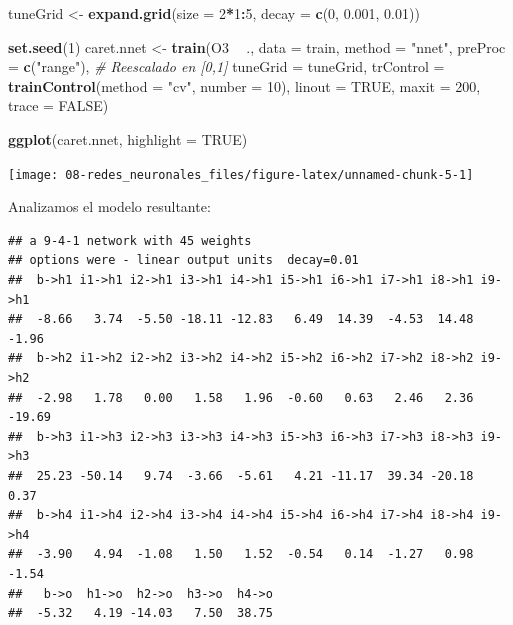 \documentclass[
  spanish,
]{book}
\newenvironment{Shaded}{\begin{snugshade}}{\end{snugshade}}
\newcommand{\CommentTok}[1]{\textcolor[rgb]{0.56,0.35,0.01}{\textit{#1}}}
\newcommand{\DataTypeTok}[1]{\textcolor[rgb]{0.13,0.29,0.53}{#1}}
\newcommand{\DecValTok}[1]{\textcolor[rgb]{0.00,0.00,0.81}{#1}}
\newcommand{\FloatTok}[1]{\textcolor[rgb]{0.00,0.00,0.81}{#1}}
\newcommand{\KeywordTok}[1]{\textcolor[rgb]{0.13,0.29,0.53}{\textbf{#1}}}
\newcommand{\NormalTok}[1]{#1}
\newcommand{\OperatorTok}[1]{\textcolor[rgb]{0.81,0.36,0.00}{\textbf{#1}}}
\newcommand{\OtherTok}[1]{\textcolor[rgb]{0.56,0.35,0.01}{#1}}
\newcommand{\StringTok}[1]{\textcolor[rgb]{0.31,0.60,0.02}{#1}}
\theoremstyle{break}
\theoremstyle{definition}
\theoremstyle{definition}
\theoremstyle{definition}
\theoremstyle{remark}
\begin{document}
\begin{Shaded}
\begin{Highlighting}[]
\NormalTok{tuneGrid <-}\StringTok{ }\KeywordTok{expand.grid}\NormalTok{(}\DataTypeTok{size =} \DecValTok{2}\OperatorTok{*}\DecValTok{1}\OperatorTok{:}\DecValTok{5}\NormalTok{, }\DataTypeTok{decay =} \KeywordTok{c}\NormalTok{(}\DecValTok{0}\NormalTok{, }\FloatTok{0.001}\NormalTok{, }\FloatTok{0.01}\NormalTok{))}

\KeywordTok{set.seed}\NormalTok{(}\DecValTok{1}\NormalTok{)}
\NormalTok{caret.nnet <-}\StringTok{ }\KeywordTok{train}\NormalTok{(O3 }\OperatorTok{~}\StringTok{ }\NormalTok{., }\DataTypeTok{data =}\NormalTok{ train, }\DataTypeTok{method =} \StringTok{"nnet"}\NormalTok{,}
             \DataTypeTok{preProc =} \KeywordTok{c}\NormalTok{(}\StringTok{"range"}\NormalTok{), }\CommentTok{# Reescalado en [0,1]}
             \DataTypeTok{tuneGrid =}\NormalTok{ tuneGrid,}
             \DataTypeTok{trControl =} \KeywordTok{trainControl}\NormalTok{(}\DataTypeTok{method =} \StringTok{"cv"}\NormalTok{, }\DataTypeTok{number =} \DecValTok{10}\NormalTok{), }
             \DataTypeTok{linout =} \OtherTok{TRUE}\NormalTok{, }\DataTypeTok{maxit =} \DecValTok{200}\NormalTok{, }\DataTypeTok{trace =} \OtherTok{FALSE}\NormalTok{)}

\KeywordTok{ggplot}\NormalTok{(caret.nnet, }\DataTypeTok{highlight =} \OtherTok{TRUE}\NormalTok{)}
\end{Highlighting}
\end{Shaded}

\begin{center}\texttt{[image: 08-redes\_neuronales\_files/figure-latex/unnamed-chunk-5-1]} \end{center}

Analizamos el modelo resultante:

\begin{Shaded}
\end{Shaded}

\begin{verbatim}
## a 9-4-1 network with 45 weights
## options were - linear output units  decay=0.01
##  b->h1 i1->h1 i2->h1 i3->h1 i4->h1 i5->h1 i6->h1 i7->h1 i8->h1 i9->h1 
##  -8.66   3.74  -5.50 -18.11 -12.83   6.49  14.39  -4.53  14.48  -1.96 
##  b->h2 i1->h2 i2->h2 i3->h2 i4->h2 i5->h2 i6->h2 i7->h2 i8->h2 i9->h2 
##  -2.98   1.78   0.00   1.58   1.96  -0.60   0.63   2.46   2.36 -19.69 
##  b->h3 i1->h3 i2->h3 i3->h3 i4->h3 i5->h3 i6->h3 i7->h3 i8->h3 i9->h3 
##  25.23 -50.14   9.74  -3.66  -5.61   4.21 -11.17  39.34 -20.18   0.37 
##  b->h4 i1->h4 i2->h4 i3->h4 i4->h4 i5->h4 i6->h4 i7->h4 i8->h4 i9->h4 
##  -3.90   4.94  -1.08   1.50   1.52  -0.54   0.14  -1.27   0.98  -1.54 
##   b->o  h1->o  h2->o  h3->o  h4->o 
##  -5.32   4.19 -14.03   7.50  38.75
\end{verbatim}
\end{document}
